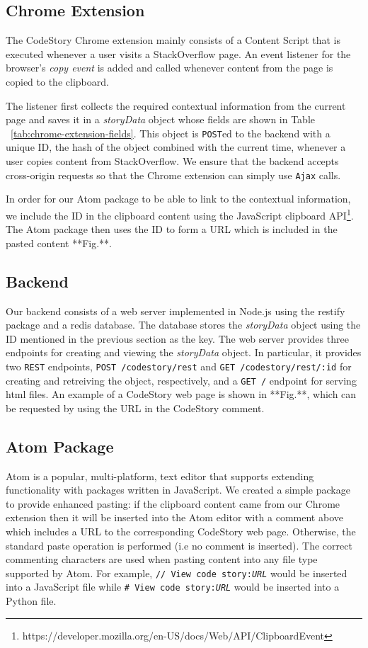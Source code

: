 \documentclass[../manifest.tex]{subfiles}
\begin{document}
\subsection{Chrome Extension}
The CodeStory Chrome extension mainly consists of a Content Script that is executed whenever a user visits a StackOverflow page. An event listener for the browser's \textit{copy event} is added and called whenever content from the page is copied to the clipboard.

The listener first collects the required contextual information from the current page and saves it in a \textit{storyData} object whose fields are shown in Table ~\ref{tab:chrome-extension-fields}. This object is \texttt{POST}ed to the backend
with a unique ID, the hash of the object combined with the current time, whenever a user copies content from StackOverflow. We ensure that the backend accepts cross-origin requests so that the Chrome extension can simply use \texttt{Ajax} calls.

In order for our Atom package to be able to link to the contextual information, we include the ID in the clipboard content using the JavaScript clipboard API\footnote{https://developer.mozilla.org/en-US/docs/Web/API/ClipboardEvent}. The Atom package then uses the ID to form a URL which is included in the pasted content **Fig.**.

\subsection{Backend}
Our backend consists of a web server implemented in Node.js using the restify package and a redis database. The database stores the \textit{storyData} object using the ID mentioned in the previous section as the key. The web server provides three endpoints for creating and viewing the \textit{storyData} object. In particular, it provides two \texttt{REST} endpoints, \texttt{POST /codestory/rest} and \texttt{GET /codestory/rest/:id} for creating and retreiving the object, respectively, and a \texttt{GET /} endpoint for serving html files. An example of a CodeStory web page is shown in **Fig.**, which can be requested by using the URL in the CodeStory comment.

\subsection{Atom Package}
Atom is a popular, multi-platform, text editor that supports extending functionality with packages written in JavaScript. We created a simple package to provide enhanced pasting: if the clipboard content came from our Chrome extension then it will be inserted into the Atom editor with a comment above which includes a URL to the corresponding CodeStory web page. Otherwise, the standard paste operation is performed (i.e no comment is inserted). The correct commenting characters are used when pasting content into any file type supported by Atom. For example, \texttt{// View code story:\textit{URL}} would be inserted into a JavaScript file while \texttt{\# View code story:\textit{URL}} would be inserted into a Python file.
\end{document}
